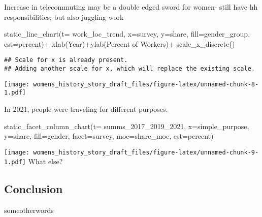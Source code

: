 \documentclass[
  12pt,
]{article}
\newenvironment{Shaded}{\begin{snugshade}}{\end{snugshade}}
\newcommand{\AttributeTok}[1]{\textcolor[rgb]{0.77,0.63,0.00}{#1}}
\newcommand{\FunctionTok}[1]{\textcolor[rgb]{0.00,0.00,0.00}{#1}}
\newcommand{\NormalTok}[1]{#1}
\newcommand{\SpecialCharTok}[1]{\textcolor[rgb]{0.00,0.00,0.00}{#1}}
\newcommand{\StringTok}[1]{\textcolor[rgb]{0.31,0.60,0.02}{#1}}
\begin{document}
Increase in telecommuting may be a double edged sword for women- still
have hh responsibilities; but also juggling work

\begin{Shaded}
\begin{Highlighting}[]
\FunctionTok{static\_line\_chart}\NormalTok{(}\AttributeTok{t=}\NormalTok{ work\_loc\_trend, }\AttributeTok{x=}\StringTok{\textquotesingle{}survey\textquotesingle{}}\NormalTok{, }\AttributeTok{y=}\StringTok{\textquotesingle{}share\textquotesingle{}}\NormalTok{,  }\AttributeTok{fill=}\StringTok{\textquotesingle{}gender\_group\textquotesingle{}}\NormalTok{, }\AttributeTok{est=}\StringTok{\textquotesingle{}percent\textquotesingle{}}\NormalTok{)}\SpecialCharTok{+}
                                \FunctionTok{xlab}\NormalTok{(}\StringTok{\textquotesingle{}Year\textquotesingle{}}\NormalTok{)}\SpecialCharTok{+}\FunctionTok{ylab}\NormalTok{(}\StringTok{\textquotesingle{}Percent of Workers\textquotesingle{}}\NormalTok{)}\SpecialCharTok{+}
                                \FunctionTok{scale\_x\_discrete}\NormalTok{()}
\end{Highlighting}
\end{Shaded}

\begin{verbatim}
## Scale for x is already present.
## Adding another scale for x, which will replace the existing scale.
\end{verbatim}

\texttt{[image: womens\_history\_story\_draft\_files/figure-latex/unnamed-chunk-8-1.pdf]}

In 2021, people were traveling for different purposes.

\begin{Shaded}
\begin{Highlighting}[]
\FunctionTok{static\_facet\_column\_chart}\NormalTok{(}\AttributeTok{t=}\NormalTok{ summs\_2017\_2019\_2021, }\AttributeTok{x=}\StringTok{\textquotesingle{}simple\_purpose\textquotesingle{}}\NormalTok{, }\AttributeTok{y=}\StringTok{\textquotesingle{}share\textquotesingle{}}\NormalTok{,  }\AttributeTok{fill=}\StringTok{\textquotesingle{}gender\textquotesingle{}}\NormalTok{, }\AttributeTok{facet=}\StringTok{\textquotesingle{}survey\textquotesingle{}}\NormalTok{, }\AttributeTok{moe=}\StringTok{\textquotesingle{}share\_moe\textquotesingle{}}\NormalTok{, }\AttributeTok{est=}\StringTok{\textquotesingle{}percent\textquotesingle{}}\NormalTok{)}
\end{Highlighting}
\end{Shaded}

\texttt{[image: womens\_history\_story\_draft\_files/figure-latex/unnamed-chunk-9-1.pdf]}
What else?

\subsection{Conclusion}

someotherwords

\fancyhead[L]{}
\end{document}
